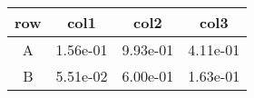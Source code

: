 \begin{tabular}{cccc}
\toprule
row&col1&col2&col3\tabularnewline
\midrule
A&1.56e-01&9.93e-01&4.11e-01\tabularnewline
B&5.51e-02&6.00e-01&1.63e-01\tabularnewline
\bottomrule
\end{tabular}
